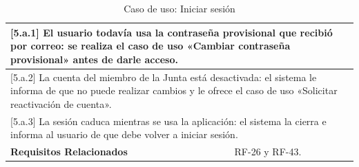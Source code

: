 \begin{table}[h!]
\begin{tabular}{|p{4cm}|p{11cm}|}
        \hline
        \multicolumn{2}{|p{15cm}|}{ [5.a.1] El usuario todavía usa la contraseña provisional que recibió por correo: se realiza el caso de uso «Cambiar contraseña provisional» antes de darle acceso. } \\
        \hline
        \multicolumn{2}{|p{15cm}|}{ [5.a.2] La cuenta del miembro de la Junta está desactivada: el sistema le informa de que no puede realizar cambios y le ofrece el caso de uso «Solicitar reactivación de cuenta». } \\
        \hline
        \multicolumn{2}{|p{15cm}|}{ [5.a.3] La sesión caduca mientras se usa la aplicación: el sistema la cierra e informa al usuario de que debe volver a iniciar sesión. } \\
        \hline
        \textbf{Requisitos Relacionados} & RF-26 y RF-43. \\
        \hline
    \end{tabular}
    \caption{Caso de uso: Iniciar sesión}
\end{table}


